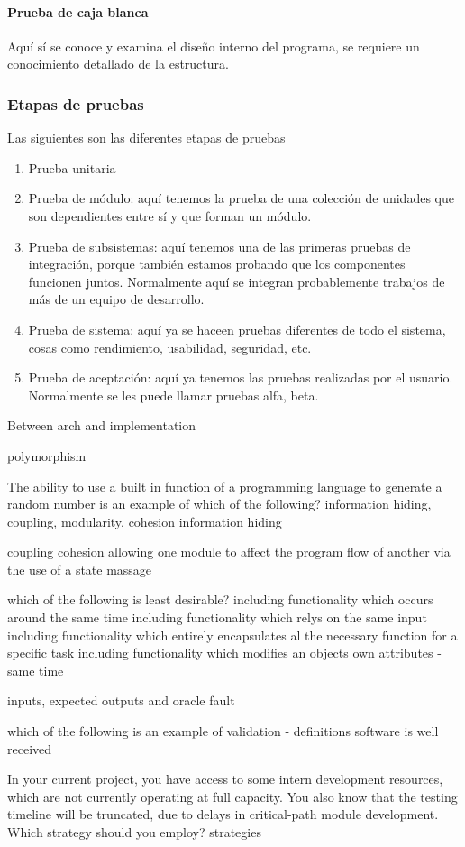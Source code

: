\paragraph{Prueba de caja blanca} Aquí sí se conoce y examina el diseño interno del programa, se requiere un conocimiento detallado de la estructura. 

\subsubsection{Etapas de pruebas}

Las siguientes son las diferentes etapas de pruebas

\begin{enumerate}
    \item Prueba unitaria
    \item Prueba de módulo: aquí tenemos la prueba de una colección de unidades que son dependientes entre sí y que forman un módulo.
    \item Prueba de subsistemas: aquí tenemos una de las primeras pruebas de integración, porque también estamos probando que los componentes funcionen juntos. Normalmente aquí se integran probablemente trabajos de más de un equipo de desarrollo. 
    \item Prueba de sistema: aquí ya se haceen pruebas diferentes de todo el sistema, cosas como rendimiento, usabilidad, seguridad, etc. 
    \item Prueba de aceptación: aquí ya tenemos las pruebas realizadas por el usuario. Normalmente se les puede llamar pruebas alfa, beta.
\end{enumerate}



Between arch and implementation

polymorphism

The ability to use a built in function of a programming language to generate a random number is an example of which of the following?
information hiding, coupling, modularity, cohesion   information hiding

coupling
cohesion
allowing one module to affect the program flow of another via the use of a state massage

which of the following is least desirable?
including functionality which occurs around the same time
including functionality which relys on the same input
including functionality which entirely encapsulates al the necessary function for a specific task
including functionality which modifies an objects own attributes - same time

inputs, expected outputs and oracle
fault

which of the following is an example of validation - definitions
software is well received

In your current project, you have access to some intern development resources, which are not currently operating at full capacity. You also know that the testing timeline will be truncated, due to delays in critical-path module development. Which strategy should you employ? strategies


